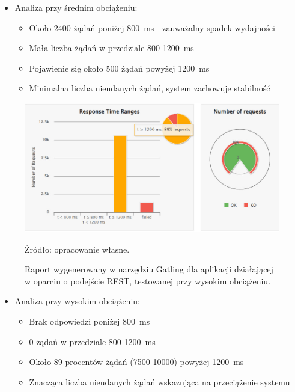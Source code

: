 \documentclass[runningheads,12pt]{llncs}
\begin{document}
\begin{itemize}
  \item Analiza przy średnim obciążeniu:
  \begin{itemize}
    \item Około 2400 żądań poniżej 800~ms - zauważalny spadek wydajności
    \item Mała liczba żądań w przedziale 800-1200~ms
    \item Pojawienie się około 500 żądań powyżej 1200~ms
    \item Minimalna liczba nieudanych żądań, system zachowuje stabilność
  \end{itemize}
\end{itemize}

\newpage

\begin{figure}
    \includegraphics[width=\linewidth]{images/rest-gatling-high-graph.jpg}
    \caption{Raport wygenerowany w narzędziu Gatling dla aplikacji działającej w oparciu o podejście REST, testowanej przy wysokim obciążeniu.} \label{fig3}
    \vspace{0.5em}
    {\small Źródło: opracowanie własne.}
\end{figure}

\begin{itemize}
  \item Analiza przy wysokim obciążeniu:
  \begin{itemize}
    \item Brak odpowiedzi poniżej 800~ms
    \item 0 żądań w przedziale 800-1200~ms
    \item Około 89 procentów żądań (7500-10000) powyżej 1200~ms
    \item Znacząca liczba nieudanych żądań wskazująca na przeciążenie systemu
  \end{itemize}
\end{itemize}
\end{document}
